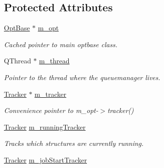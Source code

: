 \subsection*{Protected Attributes}
\begin{DoxyCompactItemize}
\item 
\hypertarget{classGlobalSearch_1_1QueueManager_a73408b74ae38d28709cc86211e569b66}{}\hyperlink{classGlobalSearch_1_1OptBase}{Opt\+Base} $\ast$ \hyperlink{classGlobalSearch_1_1QueueManager_a73408b74ae38d28709cc86211e569b66}{m\+\_\+opt}\label{classGlobalSearch_1_1QueueManager_a73408b74ae38d28709cc86211e569b66}

\begin{DoxyCompactList}\small\item\em Cached pointer to main optbase class. \end{DoxyCompactList}\item 
\hypertarget{classGlobalSearch_1_1QueueManager_aad3c44dad7c196ee965cdf4e1c66322c}{}Q\+Thread $\ast$ \hyperlink{classGlobalSearch_1_1QueueManager_aad3c44dad7c196ee965cdf4e1c66322c}{m\+\_\+thread}\label{classGlobalSearch_1_1QueueManager_aad3c44dad7c196ee965cdf4e1c66322c}

\begin{DoxyCompactList}\small\item\em Pointer to the thread where the queuemanager lives. \end{DoxyCompactList}\item 
\hypertarget{classGlobalSearch_1_1QueueManager_ab41f6210551ab04ed0518cd4f40d8e0d}{}\hyperlink{classGlobalSearch_1_1Tracker}{Tracker} $\ast$ \hyperlink{classGlobalSearch_1_1QueueManager_ab41f6210551ab04ed0518cd4f40d8e0d}{m\+\_\+tracker}\label{classGlobalSearch_1_1QueueManager_ab41f6210551ab04ed0518cd4f40d8e0d}

\begin{DoxyCompactList}\small\item\em Convenience pointer to m\+\_\+opt-\/$>$tracker() \end{DoxyCompactList}\item 
\hypertarget{classGlobalSearch_1_1QueueManager_af081fe2ea7f98693ae5a4cbc4246a812}{}\hyperlink{classGlobalSearch_1_1Tracker}{Tracker} \hyperlink{classGlobalSearch_1_1QueueManager_af081fe2ea7f98693ae5a4cbc4246a812}{m\+\_\+running\+Tracker}\label{classGlobalSearch_1_1QueueManager_af081fe2ea7f98693ae5a4cbc4246a812}

\begin{DoxyCompactList}\small\item\em Tracks which structures are currently running. \end{DoxyCompactList}\item 
\hypertarget{classGlobalSearch_1_1QueueManager_a1d9b17d2b9a12f6641282b9bab327046}{}\hyperlink{classGlobalSearch_1_1Tracker}{Tracker} \hyperlink{classGlobalSearch_1_1QueueManager_a1d9b17d2b9a12f6641282b9bab327046}{m\+\_\+job\+Start\+Tracker}\label{classGlobalSearch_1_1QueueManager_a1d9b17d2b9a12f6641282b9bab327046}


\end{DoxyCompactItemize}
